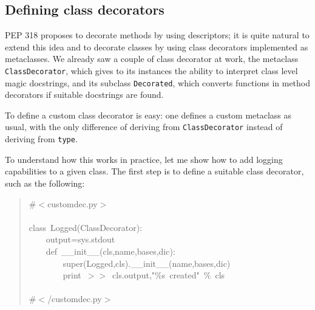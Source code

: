 \documentclass[11pt,english]{article}
\begin{document}

\hypertarget{defining-class-decorators}{}
\subsection*{Defining class decorators}

PEP 318 proposes to decorate methods by using descriptors; it is
quite natural to extend this idea and to decorate classes by using 
class decorators implemented as metaclasses. We already saw a couple of
class decorator at work, the metaclass \texttt{ClassDecorator}, which gives
to its instances the ability to interpret class level magic docstrings, and
its subclass \texttt{Decorated}, which converts functions in method decorators
if suitable docstrings are found.

To define a custom class decorator is easy: one defines a custom metaclass 
as usual, with the only difference of deriving from \texttt{ClassDecorator} instead
of deriving from \texttt{type}.

To understand how this works in practice, let me 
show how to add logging capabilities to a given class. The first
step is to define a suitable class decorator, such as the following:
\begin{quote}
\begin{ttfamily}\begin{flushleft}
\mbox{{\#}{$<$}customdec.py{$>$}}\\
\mbox{}\\
\mbox{class~Logged(ClassDecorator):}\\
\mbox{~~~~output=sys.stdout}\\
\mbox{~~~~def~{\_}{\_}init{\_}{\_}(cls,name,bases,dic):}\\
\mbox{~~~~~~~~super(Logged,cls).{\_}{\_}init{\_}{\_}(name,bases,dic)}\\
\mbox{~~~~~~~~print~{$>$}{$>$}~cls.output,"{\%}s~created"~{\%}~cls}\\
\mbox{}\\
\mbox{{\#}{$<$}/customdec.py{$>$}}
\end{flushleft}\end{ttfamily}
\end{quote}
\end{document}
